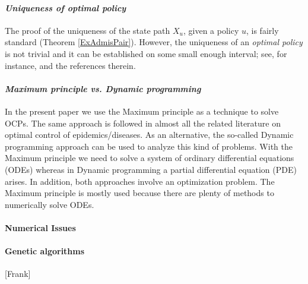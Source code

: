 \paragraph{\it Uniqueness of optimal policy}
The proof of the uniqueness of the state path $X_u$, given a policy $u$, is fairly standard (Theorem \ref{ExAdmisPair}). However, the uniqueness of an {\it optimal policy} is not trivial and it can be established on some small enough interval; see, for instance, \cite{GaffSchaefer09} and the references therein.   \medskip


\paragraph{\it Maximum principle vs. Dynamic programming} 
In the present paper we use the Maximum principle as a technique to solve OCPs. The same approach is followed in almost all the related literature on optimal control of epidemics/diseases. As an alternative, the so-called Dynamic programming approach can be used to analyze this kind of problems. With the Maximum principle we need to solve a system of ordinary differential equations (ODEs) whereas in Dynamic programming a partial differential equation (PDE) arises. In addition, both approaches involve an optimization problem. The Maximum principle is mostly used because there are plenty of methods to numerically solve ODEs.





\paragraph{Numerical Issues}
\paragraph{Genetic algorithms}[Frank]
